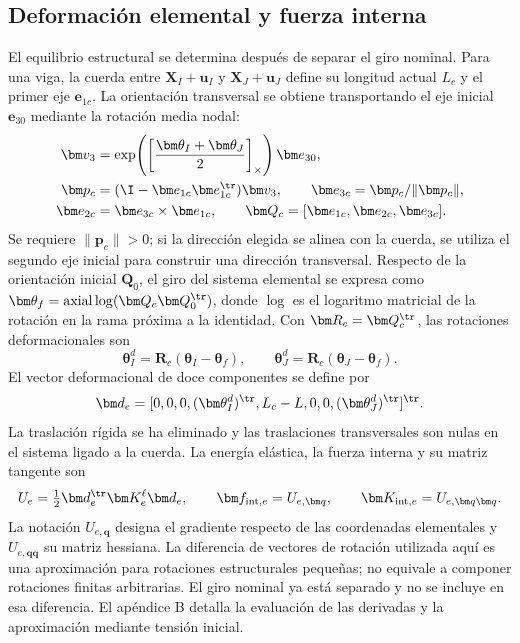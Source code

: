 \subsection{Deformación elemental y fuerza interna}
El equilibrio estructural se determina después de separar el giro nominal. Para una viga, la cuerda entre $\bm X_I+\bm u_I$ y $\bm X_J+\bm u_J$ define su longitud actual $L_c$ y el primer eje $\bm e_{1c}$. La orientación transversal se obtiene transportando el eje inicial $\bm e_{30}$ mediante la rotación media nodal:
\begin{align}
\bm v_3&=\exp\!\left(\left[\frac{\bm\theta_I+\bm\theta_J}{2}\right]_\times\right)\bm e_{30},\nonumber\\
\bm p_c&=(\I-\bm e_{1c}\bm e_{1c}^\tr)\bm v_3,\qquad
\bm e_{3c}=\bm p_c/\|\bm p_c\|,\nonumber\\
\bm e_{2c}&=\bm e_{3c}\times\bm e_{1c},\qquad
\bm Q_c=[\bm e_{1c},\bm e_{2c},\bm e_{3c}].
\end{align}
Se requiere $\|\bm p_c\|>0$; si la dirección elegida se alinea con la cuerda, se utiliza el segundo eje inicial para construir una dirección transversal. Respecto de la orientación inicial $\bm Q_0$, el giro del sistema elemental se expresa como $\bm\theta_f=\operatorname{axial}\log(\bm Q_c\bm Q_0^\tr)$, donde $\log$ es el logaritmo matricial de la rotación en la rama próxima a la identidad. Con $\bm R_c=\bm Q_c^\tr$, las rotaciones deformacionales son
\begin{equation}
\bm\theta_I^d=\bm R_c(\bm\theta_I-\bm\theta_f),\qquad
\bm\theta_J^d=\bm R_c(\bm\theta_J-\bm\theta_f).
\end{equation}
El vector deformacional de doce componentes se define por
\begin{equation}
\bm d_e=[0,0,0,(\bm\theta_I^d)^\tr,L_c-L,0,0,
(\bm\theta_J^d)^\tr]^\tr.
\end{equation}
La traslación rígida se ha eliminado y las traslaciones transversales son nulas en el sistema ligado a la cuerda. La energía elástica, la fuerza interna y su matriz tangente son
\begin{equation}
U_e=\tfrac12\bm d_e^\tr\bm K_e^\ell\bm d_e,\qquad
\bm f_{{\rm int},e}=U_{e,\bm q},\qquad
\bm K_{{\rm int},e}=U_{e,\bm q\bm q}.
\label{eq:corot}
\end{equation}
La notación $U_{e,\bm q}$ designa el gradiente respecto de las coordenadas elementales y $U_{e,\bm q\bm q}$ su matriz hessiana. La diferencia de vectores de rotación utilizada aquí es una aproximación para rotaciones estructurales pequeñas; no equivale a componer rotaciones finitas arbitrarias. El giro nominal ya está separado y no se incluye en esa diferencia. El apéndice B detalla la evaluación de las derivadas y la aproximación mediante tensión inicial.

